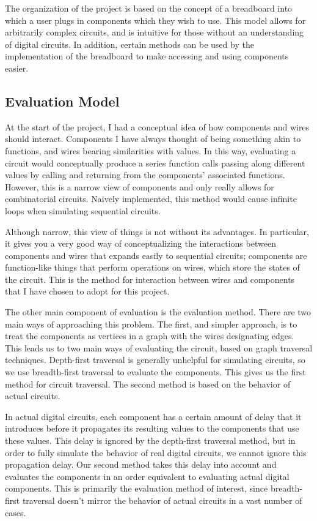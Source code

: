 \documentclass{article}
\begin{document}
The organization of the project is based on the concept of a breadboard into which a user plugs in components which they wish to use. This model allows for arbitrarily complex circuits, and is intuitive for those without an understanding of digital circuits. In addition, certain methods can be used by the implementation of the breadboard to make accessing and using components easier.

\subsection{Evaluation Model}

At the start of the project, I had a conceptual idea of how components and wires should interact. Components I have always thought of being something akin to functions, and wires bearing similarities with values. In this way, evaluating a circuit would conceptually produce a series function calls passing along different values by calling and returning from the components' associated functions. However, this is a narrow view of components and only really allows for combinatorial circuits. Naively implemented, this method would cause infinite loops when simulating sequential circuits.

Although narrow, this view of things is not without its advantages. In particular, it gives you a very good way of conceptualizing the interactions between components and wires that expands easily to sequential circuits; components are function-like things that perform operations on wires, which store the states of the circuit. This is the method for interaction between wires and components that I have chosen to adopt for this project.

The other main component of evaluation is the evaluation method. There are two main ways of approaching this problem. The first, and simpler approach, is to treat the components as vertices in a graph with the wires designating edges. This leads us to two main ways of evaluating the circuit, based on graph traversal techniques. Depth-first traversal is generally unhelpful for simulating circuits, so we use breadth-first traversal to evaluate the components. This gives us the first method for circuit traversal. The second method is based on the behavior of actual circuits.

In actual digital circuits, each component has a certain amount of delay that it introduces before it propagates its resulting values to the components that use these values. This delay is ignored by the depth-first traversal method, but in order to fully simulate the behavior of real digital circuits, we cannot ignore this propagation delay. Our second method takes this delay into account and evaluates the components in an order equivalent to evaluating actual digital components. This is primarily the evaluation method of interest, since breadth-first traversal doesn’t mirror the behavior of actual circuits in a vast number of cases.
\end{document}
